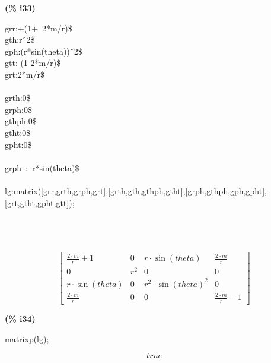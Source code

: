 \documentclass[fleqn]{article}
\begin{document}
\noindent
\begin{minipage}[t]{4.000000em}\color{red}\bfseries
(\% i33)	
\end{minipage}
\begin{minipage}[t]{\textwidth}\color{blue}
grr:+(1+\ 2*m/r)\$\\
gth:r\^\ 2\$\\
gph:(r*sin(theta))\^\ 2\$\\
gtt:-(1-2*m/r)\$\\
grt:2*m/r\$\\
\\
grth:0\$\\
grph:0\$\\
gthph:0\$\\
gtht:0\$\\
gpht:0\$\\
\\
grph\ :\ r*sin(theta)\$\\
\\
lg:matrix([grr,grth,grph,grt],[grth,gth,gthph,gtht],[grph,gthph,gph,gpht],[grt,gtht,gpht,gtt]);\ \ \ \ \ \ \ \ \ \ \ \ \ \ \ \ \ \ \ \ \ \ \ \ \ \ \ \ \ \ \ \ \ \ \ \ \ \ \ \ \ \ \ \ \ \ \ \ \ \ \ \ \ \ \ \ \ \ \ \ \ \ \ \ \ \ \ \ \ \ \ \ \ \ \ \ \ \ \ \ \ \ \ \ \ \ \ \ \ \ \ \ \ \ \ \ \ \ \ \ \ \ \ \ \ \ \ \ \ \ \ \ \ \ \ \ \ \ \ \ \ \ \ \ \ \ \ \ \ \ \ \ \ \ \ \ \ \ \ \ \ \ \ \ \ \ \ \ \ \ \ \ \ \ \ \ \ \ \ \ \ \ \ \ \ \ \ \ \ \ \ \ \ \ \ \ \ \ \ \ \ \ \ \ \ \ \ \ \ \ \ \ \ \ \ \ \ \ \ \ \ 
\end{minipage}
\[\displaystyle \tag{\% o33} 
\begin{bmatrix}\frac{2\mathop{\ensuremath{\cdot}}m}{r}\mathop{+}1 & 0 & r\mathop{\ensuremath{\cdot}}\sin{(theta)} & \frac{2\mathop{\ensuremath{\cdot}}m}{r}\\
0 & {{r}^{2}} & 0 & 0\\
r\mathop{\ensuremath{\cdot}}\sin{(theta)} & 0 & {{r}^{2}}\mathop{\ensuremath{\cdot}}{{\sin{(theta)}}^{2}} & 0\\
\frac{2\mathop{\ensuremath{\cdot}}m}{r} & 0 & 0 & \frac{2\mathop{\ensuremath{\cdot}}m}{r}\mathop{-}1\end{bmatrix}\mbox{}
\]


\noindent
\begin{minipage}[t]{4.000000em}\color{red}\bfseries
(\% i34)	
\end{minipage}
\begin{minipage}[t]{\textwidth}\color{blue}
matrixp(lg);
\end{minipage}
\[\displaystyle \tag{\% o34} 
true\mbox{}
\]
\end{document}
